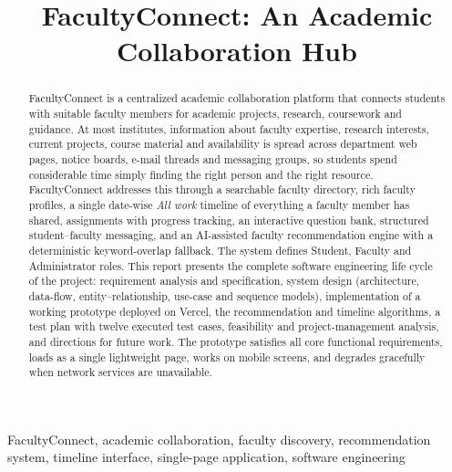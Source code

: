 \documentclass[conference]{IEEEtran}
\begin{document}
\title{FacultyConnect: An Academic Collaboration Hub}

\author{
\and
{}
\and
{}
}

\maketitle

\begin{abstract}
FacultyConnect is a centralized academic collaboration platform that connects students with suitable faculty members for academic projects, research, coursework and guidance. At most institutes, information about faculty expertise, research interests, current projects, course material and availability is spread across department web pages, notice boards, e-mail threads and messaging groups, so students spend considerable time simply finding the right person and the right resource. FacultyConnect addresses this through a searchable faculty directory, rich faculty profiles, a single date-wise \emph{All work} timeline of everything a faculty member has shared, assignments with progress tracking, an interactive question bank, structured student--faculty messaging, and an AI-assisted faculty recommendation engine with a deterministic keyword-overlap fallback. The system defines Student, Faculty and Administrator roles. This report presents the complete software engineering life cycle of the project: requirement analysis and specification, system design (architecture, data-flow, entity--relationship, use-case and sequence models), implementation of a working prototype deployed on Vercel, the recommendation and timeline algorithms, a test plan with twelve executed test cases, feasibility and project-management analysis, and directions for future work. The prototype satisfies all core functional requirements, loads as a single lightweight page, works on mobile screens, and degrades gracefully when network services are unavailable.
\end{abstract}

\begin{IEEEkeywords}
FacultyConnect, academic collaboration, faculty discovery, recommendation system, timeline interface, single-page application, software engineering
\end{IEEEkeywords}
\end{document}
